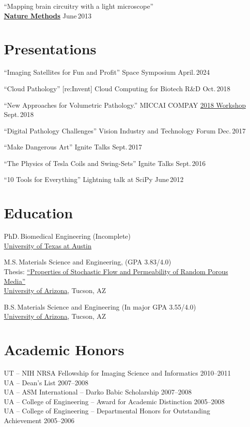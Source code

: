 \documentclass{res}
\let\oldsection\section
\renewcommand{\section}[1]{\needspace{4\baselineskip}\oldsection{#1}}
\begin{document}
\begin{resume}
  ``Mapping brain circuitry with a light microscope'' \\
  \href{https://www.ncbi.nlm.nih.gov/pmc/articles/PMC3982327/}{\textbf{Nature Methods}} \hfill June\,2013
  
\section{Presentations}
  ``Imaging Satellites for Fun and Profit''
  Space Symposium \hfill April.\,2024

  ``Cloud Pathology''
  [re:Invent] Cloud Computing for Biotech R\&D \hfill Oct.\,2018

  ``New Approaches for Volumetric Pathology.''
  MICCAI COMPAY \href{https://sites.google.com/site/compaysymposium2018/speakers}{2018 Workshop} \hfill Sept.\,2018

  ``Digital Pathology Challenges''
  Vision Industry and Technology Forum \hfill Dec.\,2017

  ``Make Dangerous Art''
  Ignite Talks \hfill Sept.\,2017

  ``The Physics of Tesla Coils and Swing-Sets''
  Ignite Talks \hfill Sept.\,2016

  ``10 Tools for Everything''
  Lightning talk at SciPy \hfill June\,2012

\section{Education}
  PhD.\,Biomedical Engineering (Incomplete) \\
  \href{https://www.bme.utexas.edu/}{University of Texas at Austin}
  
  M.S.\,Materials Science and Engineering,
  (GPA 3.83/4.0) \\
  Thesis: \href{http://hdl.handle.net/10150/193422}{``Properties of Stochastic Flow and Permeability of Random Porous Media''} \\
  \href{https://mse.engineering.arizona.edu/}{University of Arizona}, Tucson, AZ
  
  B.S.\,Materials Science and Engineering (In major GPA 3.55/4.0) \\
  \href{https://mse.engineering.arizona.edu/}{University of Arizona}, Tucson, AZ

\section{Academic Honors}
UT -- NIH NRSA Fellowship for Imaging Science and Informatics \hfill 2010--2011 \\
UA -- Dean’s List \hfill 2007--2008 \\
UA -- ASM International -- Darko Babic Scholarship \hfill 2007--2008 \\
UA -- College of Engineering -- Award for Academic Distinction \hfill 2005--2008 \\
UA -- College of Engineering -- Departmental Honors for Outstanding Achievement \hfill 2005--2006


\end{resume}
\end{document}
